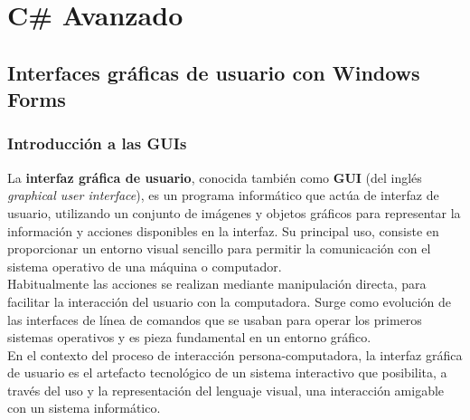\documentclass[12pt,a4paper]{report}
\begin{document}
\part{C\# Avanzado}
\chapter{ Interfaces gráficas de usuario con Windows Forms}
\section{Introducción a las GUIs}
La\textbf{ interfaz gráfica de usuario}, conocida también como\textbf{ GUI} (del inglés\textit{ graphical user interface}), es un programa informático que actúa de interfaz de usuario, utilizando un conjunto de imágenes y objetos gráficos para representar la información y acciones disponibles en la interfaz. Su principal uso, consiste en proporcionar un entorno visual sencillo para permitir la comunicación con el sistema operativo de una máquina o computador.\\Habitualmente las acciones se realizan mediante manipulación directa, para facilitar la interacción del usuario con la computadora. Surge como evolución de las interfaces de línea de comandos que se usaban para operar los primeros sistemas operativos y es pieza fundamental en un entorno gráfico.\\En el contexto del proceso de interacción persona-computadora, la interfaz gráfica de usuario es el artefacto tecnológico de un sistema interactivo que posibilita, a través del uso y la representación del lenguaje visual, una interacción amigable con un sistema informático.
\end{document}
